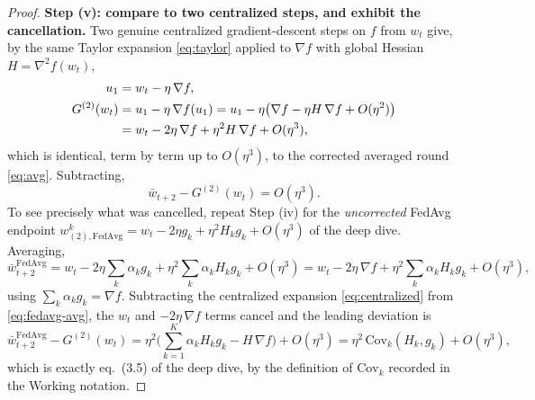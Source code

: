 \documentclass[11pt]{article}
\theoremstyle{definition}
\theoremstyle{remark}
\begin{document}
\begin{proof}
\medskip
\noindent\textbf{Step (v): compare to two centralized steps, and exhibit the cancellation.}
Two genuine centralized gradient-descent steps on $f$ from $w_t$ give, by the same Taylor
expansion \eqref{eq:taylor} applied to $\nabla f$ with global Hessian $H=\nabla^2 f(w_t)$,
\begin{align}
  u_1&=w_t-\eta\,\nabla f,\notag\\
  G^{(2)}(w_t)&=u_1-\eta\,\nabla f(u_1)
   = u_1-\eta\big(\nabla f-\eta H\,\nabla f+O(\eta^2)\big)\notag\\
  &= w_t-2\eta\,\nabla f+\eta^2 H\,\nabla f+O(\eta^3),
  \label{eq:centralized}
\end{align}
which is identical, term by term up to $O(\eta^3)$, to the corrected averaged round
\eqref{eq:avg}. Subtracting,
\begin{equation}
  \bar w_{t+2}-G^{(2)}(w_t)=O(\eta^3).
  \label{eq:corrected-gap}
\end{equation}
To see precisely what was cancelled, repeat Step (iv) for the \emph{uncorrected} FedAvg
endpoint $w^{k}_{(2),\mathrm{FedAvg}}=w_t-2\eta g_k+\eta^2 H_k g_k+O(\eta^3)$ of the deep dive.
Averaging,
\begin{equation}
  \bar w^{\mathrm{FedAvg}}_{t+2}
  = w_t-2\eta\!\sum_k\alpha_k g_k+\eta^2\!\sum_k\alpha_k H_k g_k+O(\eta^3)
  = w_t-2\eta\,\nabla f+\eta^2\!\sum_k\alpha_k H_k g_k+O(\eta^3),
  \label{eq:fedavg-avg}
\end{equation}
using $\sum_k\alpha_k g_k=\nabla f$. Subtracting the centralized expansion
\eqref{eq:centralized} from \eqref{eq:fedavg-avg}, the $w_t$ and $-2\eta\,\nabla f$ terms cancel
and the leading deviation is
\begin{equation}
  \bar w^{\mathrm{FedAvg}}_{t+2}-G^{(2)}(w_t)
  = \eta^2\Big(\sum_{k=1}^{K}\alpha_k H_k g_k-H\,\nabla f\Big)+O(\eta^3)
  = \eta^2\,\mathrm{Cov}_k(H_k,g_k)+O(\eta^3),
  \label{eq:fedavg-gap}
\end{equation}
which is exactly eq.~(3.5) of the deep dive, by the definition of $\mathrm{Cov}_k$ recorded in
the Working notation.


\end{proof}
\end{document}

